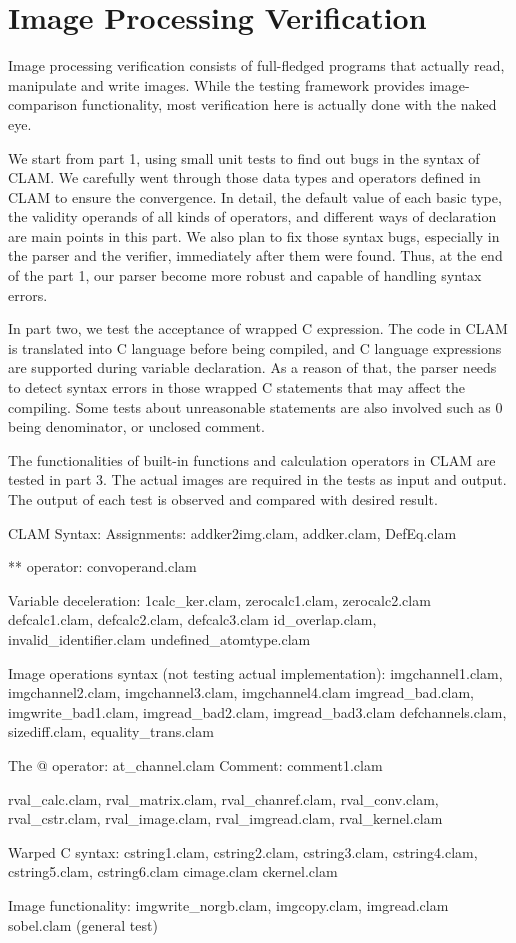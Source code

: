 \section{Image Processing Verification}
\label{test:output}

Image processing verification consists of full-fledged programs that actually read, manipulate and write images.
While the testing framework provides image-comparison functionality, most verification here is actually done
with the naked eye.


We start from part 1, using small unit tests to find out bugs in the syntax of CLAM. We carefully went through those data types and operators defined in CLAM to ensure the convergence. In detail, the default value of each basic type, the validity operands of all kinds of operators, and different ways of declaration are main points in this part. We also plan to fix those syntax bugs, especially in the parser and the verifier, immediately after them were found. Thus, at the end of the part 1, our  parser become more robust and capable of handling syntax errors.

In part two, we test the acceptance of wrapped C expression. The code in CLAM is translated into C language before being compiled, and C language expressions are supported during variable declaration. As a reason of that,  the parser needs to detect syntax errors in those wrapped C statements that may affect the compiling. Some tests about unreasonable statements are also involved such as 0 being denominator, or unclosed comment.

The functionalities of built-in functions and calculation operators in CLAM are tested in part 3. The actual images are required in the tests as input and output. The output of each test is observed and compared with desired result.

CLAM Syntax:
	Assignments: 
		addker2img.clam, addker.clam, DefEq.clam

	** operator:
		convoperand.clam

	Variable deceleration:
		1calc_ker.clam, zerocalc1.clam, zerocalc2.clam
		defcalc1.clam, defcalc2.clam, defcalc3.clam
id_overlap.clam, invalid_identifier.clam
		undefined_atomtype.clam
		

	Image operations syntax (not testing actual implementation):
		imgchannel1.clam, imgchannel2.clam, imgchannel3.clam, imgchannel4.clam
		imgread_bad.clam, imgwrite_bad1.clam, imgread_bad2.clam, imgread_bad3.clam
		defchannels.clam, sizediff.clam, equality_trans.clam

	The @ operator: at_channel.clam
	Comment: comment1.clam

	rval_calc.clam, rval_matrix.clam, rval_chanref.clam, rval_conv.clam, 
	rval_cstr.clam, rval_image.clam, rval_imgread.clam, rval_kernel.clam


Warped C syntax:
	cstring1.clam, cstring2.clam, cstring3.clam, cstring4.clam, cstring5.clam, cstring6.clam
	cimage.clam
	ckernel.clam

Image functionality:
	imgwrite_norgb.clam,  imgcopy.clam,  imgread.clam
	sobel.clam (general test)
